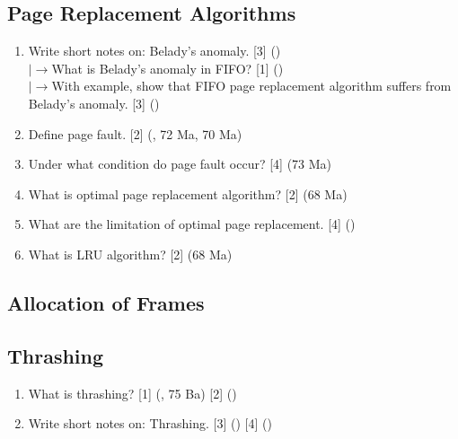 \documentclass[12pt]{article}
\newcommand{\lb}{\\$\left|\rightarrow\right.$}
\begin{document}
	\subsection{Page Replacement Algorithms}
		\begin{enumerate}[noitemsep, topsep=0pt]
			\item Write short notes on: Belady's anomaly. \hfill [3] ()
			\lb What is Belady's anomaly in FIFO? \hfill [1] ()
			\lb With example, show that FIFO page replacement algorithm suffers from Belady's anomaly. \hfill [3] ()

			\item Define page fault. \hfill [2] (, 72 Ma, 70 Ma)

			\item Under what condition do page fault occur? \hfill [4] (73 Ma)

			\item What is optimal page replacement algorithm? \hfill [2] (68 Ma)

			\item What are the limitation of optimal page replacement. \hfill [4] ()

			\item What is LRU algorithm? \hfill [2] (68 Ma)
		\end{enumerate}

	\subsection{Allocation of Frames}
	\subsection{Thrashing}
		\begin{enumerate}[noitemsep, topsep=0pt]
			\item What is thrashing? \hfill [1] (, 75 Ba) [2] ()

			\item Write short notes on: Thrashing. \hfill [3] () [4] ()
		\end{enumerate}
\end{document}

